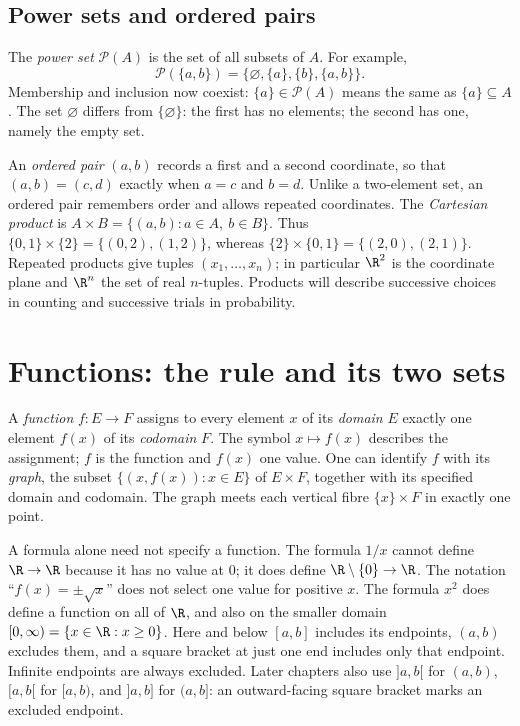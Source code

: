 \subsection*{Power sets and ordered pairs}

The \emph{power set} $\mathcal P(A)$ is the set of all subsets of $A$. For example,
\[
\mathcal P(\{a,b\})=\{\varnothing,\{a\},\{b\},\{a,b\}\}.
\]
Membership and inclusion now coexist: $\{a\}\in\mathcal P(A)$ means the same as
$\{a\}\subseteq A$. The set $\varnothing$ differs from $\{\varnothing\}$:
the first has no elements; the second has one, namely the empty set.

An \emph{ordered pair} $(a,b)$ records a first and a second coordinate, so that
$(a,b)=(c,d)$ exactly when $a=c$ and $b=d$. Unlike a two-element set, an ordered
pair remembers order and allows repeated coordinates. The \emph{Cartesian product}
is $A\times B=\{(a,b):a\in A,\ b\in B\}$.
Thus $\{0,1\}\times\{2\}=\{(0,2),(1,2)\}$, whereas
$\{2\}\times\{0,1\}=\{(2,0),(2,1)\}$.
Repeated products give tuples $(x_1,\dots,x_n)$; in particular $\R^2$ is the coordinate
plane and $\R^n$ the set of real $n$-tuples. Products will describe successive
choices in counting and successive trials in probability.

\section{Functions: the rule and its two sets}

A \emph{function} $f:E\to F$ assigns to every element $x$ of its \emph{domain} $E$
exactly one element $f(x)$ of its \emph{codomain} $F$. The symbol $x\mapsto f(x)$
describes the assignment; $f$ is the function and $f(x)$ one value.
One can identify $f$ with its \emph{graph}, the subset
$\{(x,f(x)):x\in E\}$ of $E\times F$, together with its specified domain and codomain.
The graph meets each vertical fibre $\{x\}\times F$ in exactly one point.

A formula alone need not specify a function. The formula $1/x$ cannot define
$\R\to\R$ because it has no value at $0$; it does define $\R\setminus\{0\}\to\R$.
The notation ``$f(x)=\pm\sqrt x$'' does not select one value for positive $x$.
The formula $x^2$ does define a function on all of $\R$, and also on the smaller
domain $[0,\infty)=\{x\in\R:x\ge0\}$. Here and below $[a,b]$ includes its
endpoints, $(a,b)$ excludes them, and a square bracket at just one end includes
only that endpoint. Infinite endpoints are always excluded. Later chapters also use $]a,b[$ for $(a,b)$, $[a,b[$ for $[a,b)$, and $]a,b]$ for $(a,b]$: an outward-facing square bracket marks an excluded endpoint.

